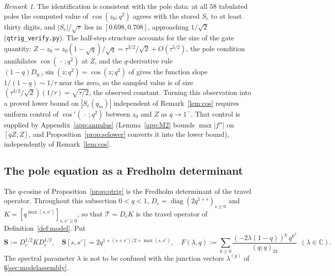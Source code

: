 \documentclass[11pt]{article}
\theoremstyle{plain}
\theoremstyle{definition}
\theoremstyle{remark}
\newtheorem{remark}[theorem]{Remark}
\newcommand{\C}{\mathbb{C}}
\begin{document}
\begin{remark}\label{rem:qtrig}
The identification is consistent with the pole data: at all $58$ tabulated poles the computed value
of $\cos(z_0;q^2)$ agrees with the stored $S_e$ to at least thirty digits, and $|S_e|/\sqrt\tau$
lies in $[0.698,0.708]$, approaching $1/\sqrt2$ (\texttt{qtrig\_verify.py}). The half-step
structure accounts for the size of the gate quantity: $Z-z_0=z_0(1-\sqrt q)/\sqrt q
=\tau^{3/2}/\sqrt2+O(\tau^{5/2})$, the pole condition annihilates $\cos(\,\cdot\,;q^2)$ at
$Z$, and the $q$-derivative rule $(1-q)D_{q,z}\sin(z;q^2)=\cos(z;q^2)$ of \cite{KS1992} gives the
function slope $1/(1-q)\sim1/\tau$ near the zero, so the sampled value is of size
$(\tau^{3/2}/\sqrt2)(1/\tau)=\sqrt{\tau/2}$, the observed constant. Turning this observation into a proved lower bound on
$|S_e(q_m)|$ independent of Remark~\ref{lem:cos} requires uniform control of
$\cos'(\,\cdot\,;q^2)$ between $z_0$ and $Z$ as $q\to1^-$. That control is supplied by
Appendix~\ref{app:annulus} (Lemma~\ref{app:M2} bounds $\max|f''|$ on $[qZ,Z]$, and
Proposition~\ref{prop:selower} converts it into the lower bound), independently of
Remark~\ref{lem:cos}.
\end{remark}

\subsection{The pole equation as a Fredholm determinant}\label{sec:fredholmdet}

The $q$-cosine of Proposition~\ref{prop:qtrig} is the Fredholm determinant of the travel operator.
Throughout this subsection $0<q<1$, $D_e=\operatorname{diag}(2q^{1+s})_{s\ge0}$ and
$K=[q^{\max(s,s')}]_{s,s'\ge0}$, so that $\mathcal T=D_eK$ is the travel operator of
Definition~\ref{def:model}. Put
\[
   \mathbf S:=D_e^{1/2}KD_e^{1/2},\quad \mathbf S[s,s']=2q^{1+(s+s')/2+\max(s,s')},\quad
   F(\lambda,q):=\sum_{k\ge0}\frac{(-2\lambda(1-q))^k\,q^{k^2}}{(q;q)_{2k}}\ \ (\lambda\in\C).
\]
The spectral parameter $\lambda$ is not to be confused with the junction vectors
$\lambda^{(y)}$ of \S\ref{sec:modelassembly}.
\end{document}
